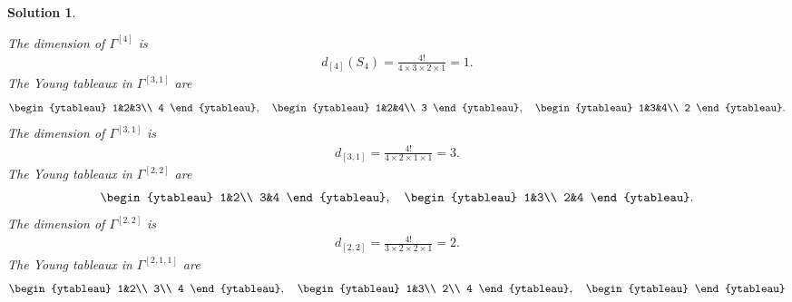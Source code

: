 \documentclass[UTF8,10pt,a4paper]{article}
\theoremstyle{Problem}
\theoremstyle{Solution}
\newtheorem*{sol}{Solution}
\begin{document}
\begin{sol}
\begin{enumerate}
\[        \]
        The dimension of $\Gamma^{[4]}$ is
        \begin{align}
            d_{[4]}(S_4)=\frac{4!}{4\times 3\times 2\times 1}=1.
        \end{align}
        The Young tableaux in $\Gamma^{[3,1]}$ are
        \[
            \begin{ytableau}
                1&2&3\\
                4
            \end{ytableau},\quad
            \begin{ytableau}
                1&2&4\\
                3
            \end{ytableau},\quad
            \begin{ytableau}
                1&3&4\\
                2
            \end{ytableau}.
        \]
        The dimension of $\Gamma^{[3,1]}$ is
        \begin{align}
            d_{[3,1]}=\frac{4!}{4\times 2\times 1\times 1}=3.
        \end{align}
        The Young tableaux in $\Gamma^{[2,2]}$ are
        \[
            \begin{ytableau}
                1&2\\
                3&4
            \end{ytableau},\quad
            \begin{ytableau}
                1&3\\
                2&4
            \end{ytableau}.
        \]
        The dimension of $\Gamma^{[2,2]}$ is
        \begin{align}
            d_{[2,2]}=\frac{4!}{3\times 2\times 2\times 1}=2.
        \end{align}
        The Young tableaux in $\Gamma^{[2,1,1]}$ are
        \[
            \begin{ytableau}
                1&2\\
                3\\
                4
            \end{ytableau},\quad
            \begin{ytableau}
                1&3\\
                2\\
                4
            \end{ytableau},\quad
            \begin{ytableau}

\end{ytableau}\]
\end{enumerate}
\end{sol}
\end{document}
